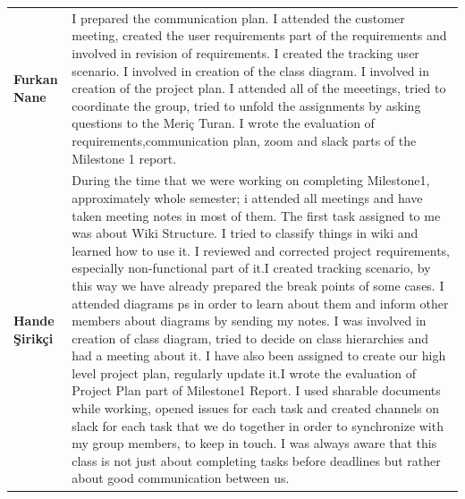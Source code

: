 \documentclass[]{article}
\begin{document}
\begin{table}[H]
{\begin{tabulary}{1.3\textwidth}{LL}
            \textbf{Furkan Nane}       & I prepared the communication plan. I attended the customer meeting, created the user requirements part of the requirements and involved in revision of requirements. I created the tracking user scenario. I involved in creation of the class diagram. I involved in creation of the project plan. I attended all of the meeetings, tried to coordinate the group, tried to unfold the assignments by asking questions to the Meriç Turan. I wrote the evaluation of requirements,communication plan, zoom and slack parts of the Milestone 1 report.                                                                                                                                                                                                                                                                                                                                                                                                                                                                                                                                                                                                                                                                                                                                                                                                                                                                                                                                                                                                                                                                 \\
            \textbf{Hande Şirikçi}         & During the time that we were working on completing Milestone1, approximately whole semester; i attended all meetings and have taken meeting notes in most of them. The first task assigned to me was about Wiki Structure. I tried to classify things in wiki and learned how to use it. I reviewed and corrected project requirements, especially non-functional part of it.I created tracking scenario, by this way we have already prepared the break points of some cases. I attended diagrams ps in order to learn about them and inform other members about diagrams by sending my notes. I was involved in creation of class diagram, tried to decide on class hierarchies and had a meeting about it. I have also been assigned to create our high level project plan, regularly update it.I wrote the evaluation of Project Plan part of Milestone1 Report. I used sharable documents while working, opened issues for each task and created channels on slack for each task that we do together in order to synchronize with my group members, to keep in touch. I was always aware that this class is not just about completing tasks before deadlines but rather about good communication between us.                                                                                                                                                                                                                                                                                                                                                                                                      \\ \midrule

\end{tabulary}}
\end{table}
\end{document}

